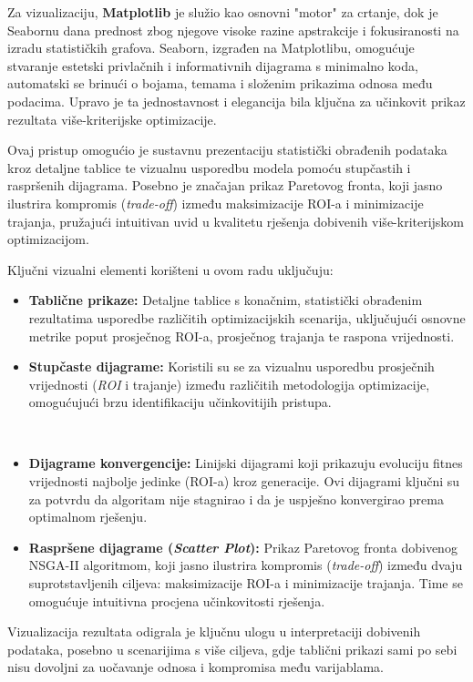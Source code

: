 Za vizualizaciju, \textbf{Matplotlib} je služio kao osnovni "motor" za crtanje, dok je Seabornu dana prednost zbog njegove visoke razine apstrakcije i fokusiranosti na izradu statističkih grafova. Seaborn, izgrađen na Matplotlibu, omogućuje stvaranje estetski privlačnih i informativnih dijagrama s minimalno koda, automatski se brinući o bojama, temama i složenim prikazima odnosa među podacima. Upravo je ta jednostavnost i elegancija bila ključna za učinkovit prikaz rezultata više-kriterijske optimizacije.

Ovaj pristup omogućio je sustavnu prezentaciju statistički obrađenih podataka kroz detaljne tablice te vizualnu usporedbu modela pomoću stupčastih i raspršenih dijagrama. Posebno je značajan prikaz Paretovog fronta, koji jasno ilustrira kompromis (\textit{trade-off}) između maksimizacije ROI-a i minimizacije trajanja, pružajući intuitivan uvid u kvalitetu rješenja dobivenih više-kriterijskom optimizacijom.

Ključni vizualni elementi korišteni u ovom radu uključuju:
\begin{itemize}
    \item \textbf{Tablične prikaze:} Detaljne tablice s konačnim, statistički obrađenim rezultatima usporedbe različitih optimizacijskih scenarija, uključujući osnovne metrike poput prosječnog ROI-a, prosječnog trajanja te raspona vrijednosti.
    \item \textbf{Stupčaste dijagrame:} Koristili su se za vizualnu usporedbu prosječnih vrijednosti (\textit{ROI} i trajanje) između različitih metodologija optimizacije, omogućujući brzu identifikaciju učinkovitijih pristupa.

   \item \textbf{Dijagrame konvergencije:} Linijski dijagrami koji prikazuju evoluciju fitnes vrijednosti najbolje jedinke (ROI-a) kroz generacije. Ovi dijagrami ključni su za potvrdu da algoritam nije stagnirao i da je uspješno konvergirao prema optimalnom rješenju.
    \item \textbf{Raspršene dijagrame (\textit{Scatter Plot}):} Prikaz Paretovog fronta dobivenog NSGA-II algoritmom, koji jasno ilustrira kompromis (\textit{trade-off}) između dvaju suprotstavljenih ciljeva: maksimizacije ROI-a i minimizacije trajanja. Time se omogućuje intuitivna procjena učinkovitosti rješenja.
\end{itemize}

Vizualizacija rezultata odigrala je ključnu ulogu u interpretaciji dobivenih podataka, posebno u scenarijima s više ciljeva, gdje tablični prikazi sami po sebi nisu dovoljni za uočavanje odnosa i kompromisa među varijablama.

